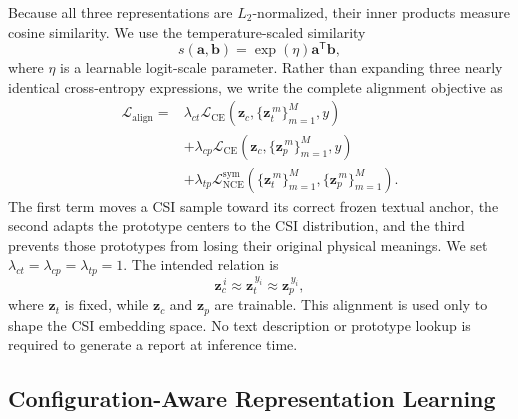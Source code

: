 Because all three representations are $L_2$-normalized, their inner products measure cosine similarity.
We use the temperature-scaled similarity
\begin{equation}
s(\mathbf a,\mathbf b)=\exp(\eta)\mathbf a^{\mathsf T}\mathbf b,
\label{eq:semantic-similarity}
\end{equation}
where $\eta$ is a learnable logit-scale parameter. Rather than expanding three nearly identical
cross-entropy expressions, we write the complete alignment objective as
\begin{align}
\mathcal L_{\mathrm{align}}
={}&\lambda_{ct}\mathcal L_{\mathrm{CE}}
\!\left(\mathbf z_c,\{\mathbf z_t^{\,m}\}_{m=1}^{M},y\right)
\nonumber\\
&+\lambda_{cp}\mathcal L_{\mathrm{CE}}
\!\left(\mathbf z_c,\{\mathbf z_p^{\,m}\}_{m=1}^{M},y\right)
\nonumber\\
&+\lambda_{tp}\mathcal L_{\mathrm{NCE}}^{\mathrm{sym}}
\!\left(\{\mathbf z_t^{\,m}\}_{m=1}^{M},
\{\mathbf z_p^{\,m}\}_{m=1}^{M}\right).
\label{eq:semantic-alignment-loss}
\end{align}
The first term moves a CSI sample toward its correct frozen textual anchor, the second adapts the
prototype centers to the CSI distribution, and the third prevents those prototypes from losing their
original physical meanings. We set $\lambda_{ct}=\lambda_{cp}=\lambda_{tp}=1$. The intended relation is
\begin{equation}
\mathbf z_c^{\,i}\approx\mathbf z_t^{\,y_i}\approx\mathbf z_p^{\,y_i},
\label{eq:semantic-relation}
\end{equation}
where $\mathbf z_t$ is fixed, while $\mathbf z_c$ and $\mathbf z_p$ are trainable. This alignment is used
only to shape the CSI embedding space. No text description or prototype lookup is required to generate
a report at inference time.

\subsection{Configuration-Aware Representation Learning}
\label{subsec:configuration-aware}

